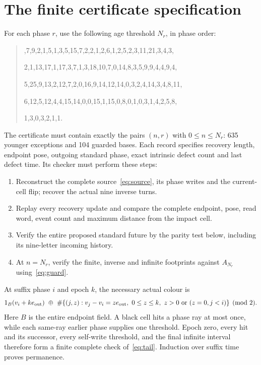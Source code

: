 \documentclass[11pt]{article}
\begin{document}
\section{The finite certificate specification}\label{sec:certificate}
For each phase $r$, use the following age threshold $N_r$, in phase order:
\begin{quote}\small{},7,9,2,1,5,1,3,5,15,7,2,2,1,2,6,1,2,5,2,3,11,21,3,4,3,\par
2,1,13,17,1,17,3,7,1,3,18,10,7,0,14,8,3,5,9,9,4,4,9,4,\par
5,25,9,13,2,12,7,2,0,16,9,14,12,14,0,3,2,4,14,3,4,8,11,\par
6,12,5,12,4,4,15,14,0,0,15,1,15,0,8,0,1,0,3,1,4,2,5,8,\par
1,3,0,3,2,1,1.
\end{quote}
The certificate must contain exactly the pairs $(n,r)$ with $0\le n\le N_r$:
635 younger exceptions and 104 guarded bases. Each record specifies recovery
length, endpoint pose, outgoing standard phase, exact intrinsic defect count
and last defect time. Its checker must perform these steps:
\begin{enumerate}
\item Reconstruct the complete source~\eqref{eq:source}, its phase writes and
the current-cell flip; recover the actual nine inverse turns.
\item Replay every recovery update and compare the complete endpoint, pose,
read word, event count and maximum distance from the impact cell.
\item Verify the entire proposed standard future by the parity test below,
including its nine-letter incoming history.
\item At $n=N_r$, verify the finite, inverse and infinite footprints against
$A_{N_r}$ using~\eqref{eq:guard}.
\end{enumerate}

At suffix phase $i$ and epoch $k$, the necessary actual colour is
\begin{equation}\label{eq:tail}
 1_B(v_i+ke_{\rm out})\ \mathbin{\oplus}\
 \#\{(j,z):v_j-v_i=ze_{\rm out},\ 0\le z\le k,
                 \ z>0\text{ or }(z=0,j<i)\}\pmod2.
\end{equation}
Here $B$ is the entire endpoint field. A black cell hits a phase ray at most
once, while each same-ray earlier phase supplies one threshold. Epoch zero,
every hit and its successor, every self-write threshold, and the final
infinite interval therefore form a finite complete check of~\eqref{eq:tail}.
Induction over suffix time proves permanence.
\end{document}
